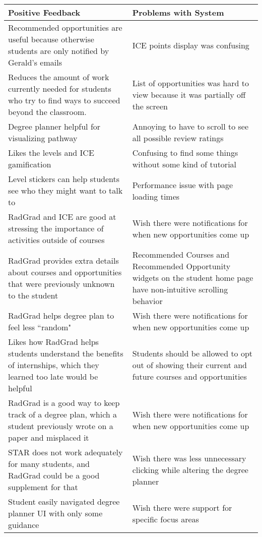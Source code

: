 \begin{table}[htbp!]
\centering
\begin{tabular}{ |p{8cm}|p{8cm}|}
 \hline
\textbf{Positive Feedback} & \textbf{Problems with System} \\
 \hline
 Recommended opportunities are useful because otherwise students are only notified by Gerald's emails  & ICE points display was confusing \\
 \hline
 Reduces the amount of work currently needed for students who try to find ways to succeed beyond the classroom. &List of opportunities was hard to view because it was partially off the screen\\
 \hline
 Degree planner helpful for visualizing pathway &Annoying to have to scroll to see all possible review ratings\\
  \hline
Likes the levels and ICE gamification &Confusing to find some things without some kind of tutorial \\
 \hline
Level stickers can help students see who they might want to talk to &Performance issue with page loading times \\
 \hline
RadGrad and ICE are good at stressing the importance of activities outside of courses &Wish there were notifications for when new opportunities come up\\
 \hline
RadGrad provides extra details about courses and opportunities that were previously unknown to the student &Recommended Courses and Recommended Opportunity widgets on the student home page have non-intuitive scrolling behavior\\
 \hline
RadGrad helps degree plan to feel less ``random" &Wish there were notifications for when new opportunities come up\\
 \hline
Likes how RadGrad helps students understand the benefits of internships, which they learned too late would be helpful &Students should be allowed to opt out of showing their current and future courses and opportunities\\
 \hline
RadGrad is a good way to keep track of a degree plan, which a student previously wrote on a paper and misplaced it & Wish there were notifications for when new opportunities come up \\
 \hline
 STAR does not work adequately for many students, and RadGrad could be a good supplement for that & Wish there was less unnecessary clicking while altering the degree planner\\
 \hline
Student easily navigated degree planner UI with only some guidance &Wish there were support for specific focus areas\\

\end{tabular}
\end{table}
